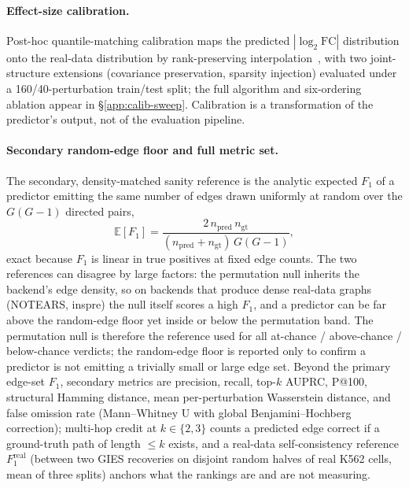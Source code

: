 \documentclass{article}
\theoremstyle{plain}
\theoremstyle{definition}
\theoremstyle{remark}
\begin{document}
\paragraph{Effect-size calibration.} Post-hoc quantile-matching calibration maps the predicted $|\log_2\mathrm{FC}|$ distribution onto the real-data distribution by rank-preserving interpolation~\citep{bolstad2003,reinhard2001}, with two joint-structure extensions (covariance preservation, sparsity injection) evaluated under a 160/40-perturbation train/test split; the full algorithm and six-ordering ablation appear in \S\ref{app:calib-sweep}. Calibration is a transformation of the predictor's output, not of the evaluation pipeline.

\paragraph{Secondary random-edge floor and full metric set.} The secondary, density-matched sanity reference is the analytic expected $F_1$ of a predictor emitting the same number of edges drawn uniformly at random over the $G(G{-}1)$ directed pairs,
\[
\mathbb{E}[F_1]=\frac{2\,n_{\text{pred}}\,n_{\text{gt}}}{(n_{\text{pred}}+n_{\text{gt}})\,G(G{-}1)},
\]
exact because $F_1$ is linear in true positives at fixed edge counts. The two references can disagree by large factors: the permutation null inherits the backend's edge density, so on backends that produce dense real-data graphs (NOTEARS, inspre) the null itself scores a high $F_1$, and a predictor can be far above the random-edge floor yet inside or below the permutation band. The permutation null is therefore the reference used for all at-chance / above-chance / below-chance verdicts; the random-edge floor is reported only to confirm a predictor is not emitting a trivially small or large edge set. Beyond the primary edge-set $F_1$, secondary metrics are precision, recall, top-$k$ AUPRC, P@100, structural Hamming distance, mean per-perturbation Wasserstein distance, and false omission rate (Mann--Whitney U with global Benjamini--Hochberg correction); multi-hop credit at $k\in\{2,3\}$ counts a predicted edge correct if a ground-truth path of length $\leq k$ exists, and a real-data self-consistency reference $F_1^{\text{real}}$ (between two GIES recoveries on disjoint random halves of real K562 cells, mean of three splits) anchors what the rankings are and are not measuring.
\end{document}
